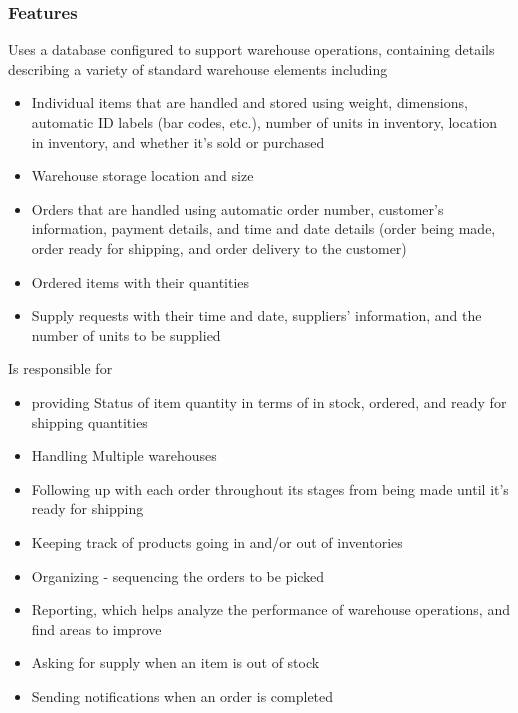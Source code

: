 \subsubsection{Features}
Uses a database configured to support warehouse operations, containing details describing a
variety of standard warehouse elements including
\begin{itemize}
    \item Individual items that are handled and stored using weight, dimensions, automatic ID
    labels (bar codes, etc.), number of units in inventory, location in inventory, and
    whether it’s sold or purchased
    \item Warehouse storage location and size
    \item Orders that are handled using automatic order number, customer’s information,
    payment details, and time and date details (order being made, order ready for
    shipping, and order delivery to the customer)
    \item Ordered items with their quantities
    \item Supply requests with their time and date, suppliers’ information, and the number of
    units to be supplied
\end{itemize}
Is responsible for
\begin{itemize}
    \item providing Status of item quantity in terms of in stock, ordered, and ready for shipping
    quantities
    \item Handling Multiple warehouses
    \item Following up with each order throughout its stages from being made until it’s ready
    for shipping
    \item Keeping track of products going in and/or out of inventories
    \item Organizing - sequencing the orders to be picked
    \item Reporting, which helps analyze the performance of warehouse operations, and find
    areas to improve
    \item Asking for supply when an item is out of stock
    \item Sending notifications when an order is completed
\end{itemize}

